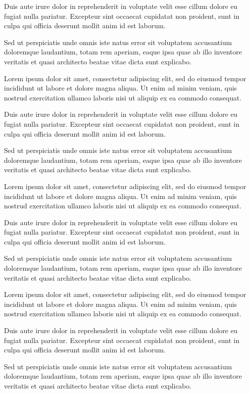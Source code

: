\documentclass[oneside]{memoir}
\begin{document}
Duis aute irure dolor in reprehenderit in voluptate velit esse cillum dolore eu fugiat nulla pariatur. Excepteur sint occaecat cupidatat non proident, sunt in culpa qui officia deserunt mollit anim id est laborum.

Sed ut perspiciatis unde omnis iste natus error sit voluptatem accusantium doloremque laudantium, totam rem aperiam, eaque ipsa quae ab illo inventore veritatis et quasi architecto beatae vitae dicta sunt explicabo.

Lorem ipsum dolor sit amet, consectetur adipiscing elit, sed do eiusmod tempor incididunt ut labore et dolore magna aliqua. Ut enim ad minim veniam, quis nostrud exercitation ullamco laboris nisi ut aliquip ex ea commodo consequat.

Duis aute irure dolor in reprehenderit in voluptate velit esse cillum dolore eu fugiat nulla pariatur. Excepteur sint occaecat cupidatat non proident, sunt in culpa qui officia deserunt mollit anim id est laborum.

Sed ut perspiciatis unde omnis iste natus error sit voluptatem accusantium doloremque laudantium, totam rem aperiam, eaque ipsa quae ab illo inventore veritatis et quasi architecto beatae vitae dicta sunt explicabo.

Lorem ipsum dolor sit amet, consectetur adipiscing elit, sed do eiusmod tempor incididunt ut labore et dolore magna aliqua. Ut enim ad minim veniam, quis nostrud exercitation ullamco laboris nisi ut aliquip ex ea commodo consequat.

Duis aute irure dolor in reprehenderit in voluptate velit esse cillum dolore eu fugiat nulla pariatur. Excepteur sint occaecat cupidatat non proident, sunt in culpa qui officia deserunt mollit anim id est laborum.

Sed ut perspiciatis unde omnis iste natus error sit voluptatem accusantium doloremque laudantium, totam rem aperiam, eaque ipsa quae ab illo inventore veritatis et quasi architecto beatae vitae dicta sunt explicabo.

Lorem ipsum dolor sit amet, consectetur adipiscing elit, sed do eiusmod tempor incididunt ut labore et dolore magna aliqua. Ut enim ad minim veniam, quis nostrud exercitation ullamco laboris nisi ut aliquip ex ea commodo consequat.

Duis aute irure dolor in reprehenderit in voluptate velit esse cillum dolore eu fugiat nulla pariatur. Excepteur sint occaecat cupidatat non proident, sunt in culpa qui officia deserunt mollit anim id est laborum.

Sed ut perspiciatis unde omnis iste natus error sit voluptatem accusantium doloremque laudantium, totam rem aperiam, eaque ipsa quae ab illo inventore veritatis et quasi architecto beatae vitae dicta sunt explicabo.
\end{document}
